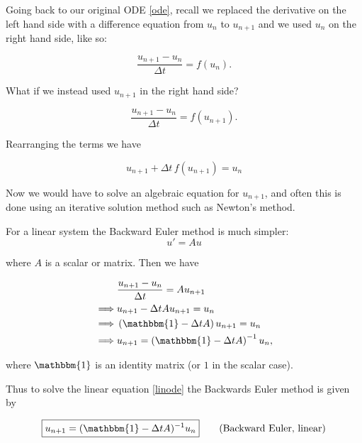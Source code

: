 \documentclass{article}
\newcommand{\dt}{\Delta t}
\newcommand{\uni}{u_{n+1}}
\newcommand{\Id}{\mathbbm{1}}
\begin{document}
Going back to our original ODE \eqref{ode}, recall we replaced the derivative on the left hand side
with a difference equation from $u_n$ to $\uni$ and we used $u_n$ on the right hand side, like so:

\begin{equation}
    \frac{\uni - u_n }{ \dt } = f(u_n).
\end{equation}

What if we instead used $\uni$ in the right hand side?

\begin{equation}
    \frac{\uni - u_n }{ \dt } = f(\uni).
\end{equation}

Rearranging the terms we have

\begin{equation}
    \boxed{\uni + \dt\, f(\uni) = u_n}
    \label{beuler}
    \tag{Backward Euler}
\end{equation}

Now we would have to solve an algebraic equation for $\uni$, and often this is done
using an iterative solution method such as Newton's method.

For a linear system the Backward Euler method is much simpler:
\begin{equation}
    u' = A u
    \label{linode}
\end{equation}

where $A$ is a scalar or matrix. Then we have

\begin{equation}
    \begin{split}
        &\frac{\uni - u_n}{\dt} = A \uni \\
        \implies &\uni - \dt A \uni = u_n \\
        \implies &\left(\Id - \dt A \right) \uni = u_n \\
        \implies  &\uni = \left(\Id - \dt A \right)^{-1}  u_n, \\
    \end{split}
\end{equation}

where $\Id$ is an identity matrix (or $1$ in the scalar case).


Thus to solve the linear equation \eqref{linode} the Backwards Euler method is given by

\begin{equation}
    \boxed{\uni = (\Id - \dt A)^{-1} u_n}
    \label{linbeuler}
    \tag{Backward Euler, linear}
\end{equation}
\end{document}
